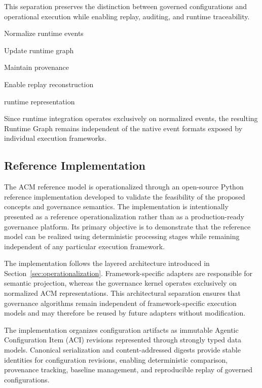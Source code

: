 \documentclass[10pt]{article}
\begin{document}
This separation preserves the distinction between governed configurations and operational execution while enabling replay, auditing, and runtime traceability.

\begin{algorithm}[ht]
\caption{Runtime Integration}

Normalize runtime events\;

Update runtime graph\;

Maintain provenance\;

Enable replay reconstruction\;

\Return runtime representation\;

\end{algorithm}

Since runtime integration operates exclusively on normalized events, the resulting Runtime Graph remains independent of the native event formats exposed by individual execution frameworks.

\subsection{Reference Implementation}
\label{sec:reference_implementation}

The ACM reference model is operationalized through an open-source Python reference implementation developed to validate the feasibility of the proposed concepts and governance semantics. The implementation is intentionally presented as a reference operationalization rather than as a production-ready governance platform. Its primary objective is to demonstrate that the reference model can be realized using deterministic processing stages while remaining independent of any particular execution framework.

The implementation follows the layered architecture introduced in Section~\ref{sec:operationalization}. Framework-specific adapters are responsible for semantic projection, whereas the governance kernel operates exclusively on normalized ACM representations. This architectural separation ensures that governance algorithms remain independent of framework-specific execution models and may therefore be reused by future adapters without modification.

The implementation organizes configuration artifacts as immutable Agentic Configuration Item (ACI) revisions represented through strongly typed data models. Canonical serialization and content-addressed digests provide stable identities for configuration revisions, enabling deterministic comparison, provenance tracking, baseline management, and reproducible replay of governed configurations.
\end{document}
